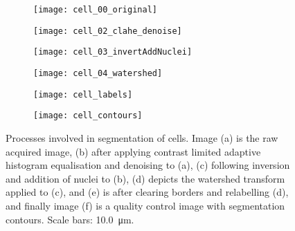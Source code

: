 \begin{figure}[htbp]\centering
	\begin{subfigure}[b]{0.45\linewidth} %
		\centering
		\texttt{[image: cell\_00\_original]}
		\caption{}
		\label{figure:image_processing:cell_segmentation:original}
		\vspace{1ex}
	\end{subfigure}
	\begin{subfigure}[b]{0.45\linewidth} %
		\centering
		\texttt{[image: cell\_02\_clahe\_denoise]}
		\caption{}
		\label{figure:image_processing:cell_segmentation:clahe_denoise}
		\vspace{1ex}
	\end{subfigure}
	\begin{subfigure}[b]{0.45\linewidth} %
		\centering
		\texttt{[image: cell\_03\_invertAddNuclei]}
		\caption{}
		\label{figure:image_processing:cell_segmentation:invertAddNuclei}
		\vspace{1ex}
	\end{subfigure}
	\begin{subfigure}[b]{0.45\linewidth} %
		\centering
		\texttt{[image: cell\_04\_watershed]}
		\caption{}
		\label{figure:image_processing:cell_segmentation:watershed}
		\vspace{1ex}
	\end{subfigure}
	\begin{subfigure}[b]{0.45\linewidth} %
		\centering
		\texttt{[image: cell\_labels]}
		\caption{}
		\label{figure:image_processing:cell_segmentation:cell_labels}
		\vspace{1ex}
	\end{subfigure}
	\begin{subfigure}[b]{0.45\linewidth} %
		\centering
		\texttt{[image: cell\_contours]}
		\caption{}
		\label{figure:image_processing:cell_segmentation:contours}
		\vspace{1ex}
	\end{subfigure}
	\vspace{-1ex}
\caption[Cell segmentation]{Processes involved in segmentation of cells. Image (a) is the raw acquired image, (b) after applying contrast limited adaptive histogram equalisation and denoising to (a), (c) following inversion and addition of nuclei to (b), (d) depicts the watershed transform applied to (c), and (e) is after clearing borders and relabelling (d), and finally image (f) is a quality control image with segmentation contours. Scale bars: \SI{10.0}{\micro\meter}.}
\label{figure:image_processing:cell_segmentation}
\end{figure}

